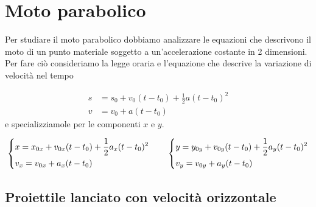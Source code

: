 \documentclass{article}
\begin{document}
\tableofcontents
\newpage

\section{Moto parabolico}
Per studiare il moto parabolico dobbiamo analizzare le equazioni che descrivono il moto di un punto materiale soggetto a un'accelerazione costante in 2 dimensioni.
Per fare ciò consideriamo la legge oraria e l'equazione che descrive la variazione di velocità nel tempo 

\begin{align}
  s &= s_0 + v_0 (t-t_0) + \frac{1}{2}a(t-t_0)^2 \\
  v &= v_0 + a(t-t_0)
\end{align}
e specializziamole per le componenti $x$ e $y$.

\begin{equation} \label{2dgeneric}
  \begin{dcases}
    x = x_{0x} + v_{0x} (t-t_0) + \frac{1}{2}a_x(t-t_0)^2 \\
    v_x = v_{0x} + a_x(t-t_0)
  \end{dcases}
  \qquad
  \begin{dcases}
    y = y_{0y} + v_{0y} (t-t_0) + \frac{1}{2}a_y(t-t_0)^2 \\
    v_y = v_{0y} + a_y(t-t_0)
  \end{dcases}
\end{equation}

\subsection{Proiettile lanciato con velocità orizzontale}
\begin{center}
\end{center}
\end{document}
